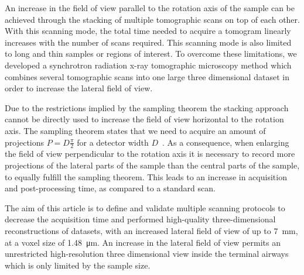 An increase in the field of view parallel to the rotation axis of the sample can be achieved through the stacking of multiple tomographic scans on top of each other. With this scanning mode, the total time needed to acquire a tomogram linearly increases with the number of scans required. This scanning mode is also limited to long and thin samples or regions of interest. 
To overcome these limitations, we developed a synchrotron radiation x-ray tomographic microscopy method which combines several tomographic scans into one large three dimensional dataset in order to increase the lateral field of view.

Due to the restrictions implied by the sampling theorem the stacking approach cannot be directly used to increase the field of view horizontal to the rotation axis. The sampling theorem states that we need to acquire an amount of projections $P=D\frac{\pi}{2}$ for a detector width $D$~\cite[page 186]{Kak2002}. As a consequence, when enlarging the field of view perpendicular to the rotation axis it is necessary to record more projections of the lateral parts of the sample than the central parts of the sample, to equally fulfill the sampling theorem. This leads to an increase in acquisition and post-processing time, as compared to a standard scan.

The aim of this article is to define and validate multiple scanning protocols to decrease the acquisition time and performed high-quality three-dimensional reconstructions of datasets, with an increased lateral field of view of up to \SI{7}{\milli\meter}, at a voxel size of \SI{1.48}{\micro\meter}. An increase in the lateral field of view permits an unrestricted high-resolution three dimensional view inside the terminal airways which is only limited by the sample size.